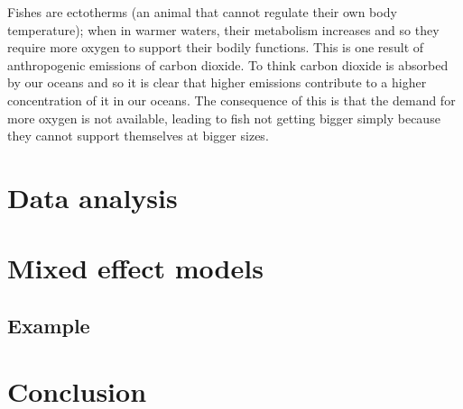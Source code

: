 \documentclass{article}
\begin{document}
Fishes are ectotherms (an animal that cannot regulate their own body temperature); when in warmer waters, their metabolism increases and so they require more oxygen to support their bodily functions. This is one result of anthropogenic emissions of carbon dioxide. To think carbon dioxide is absorbed by our oceans and so it is clear that higher emissions contribute to a higher concentration of it in our oceans. The consequence of this is that the demand for more oxygen is not available, leading to fish not getting bigger simply because they cannot support themselves at bigger sizes. 

\section{Data analysis}

\section{Mixed effect models}

\subsection{Example}

\section{Conclusion}



\end{document}
